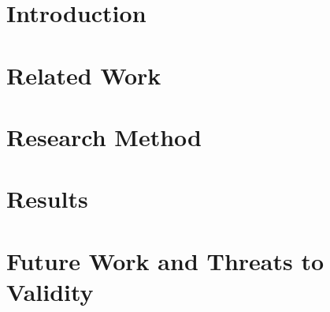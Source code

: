 \documentclass[english]{sbcreviews-2025}%
\begin{document}
\section{Introduction}\label{sec:intro}



\section{Related Work}\label{sec:relatedwork}



\section{Research Method}\label{sec:researchmethod}



\section{Results}\label{sec:results}



% 


\section{Future Work and Threats to Validity}\label{sec:futurework}



\end{document}
